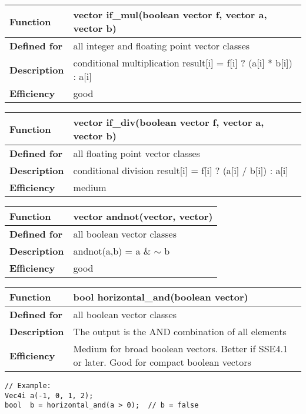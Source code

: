 \documentclass[vcl_manual.tex]{subfiles}
\begin{document}
\begin{tabular}{|p{30mm}|p{120mm}|}
\hline
\bfseries Function & vector if\_mul(boolean vector f, vector a, vector b) \\ \hline
\bfseries Defined for & all integer and floating point vector classes \\ \hline
\bfseries Description & conditional multiplication\newline
result[i] = f[i] ? (a[i] * b[i]) : a[i] \\ \hline
\bfseries Efficiency & good \\ \hline
\end{tabular}

\begin{tabular}{|p{30mm}|p{120mm}|}
\hline
\bfseries Function & vector if\_div(boolean vector f, vector a, vector b) \\ \hline
\bfseries Defined for & all floating point vector classes \\ \hline
\bfseries Description & conditional division\newline
result[i] = f[i] ? (a[i] / b[i]) : a[i] \\ \hline
\bfseries Efficiency & medium \\ \hline
\end{tabular}


\begin{tabular}{|p{30mm}|p{120mm}|}
\hline
\bfseries Function & vector andnot(vector, vector) \\ \hline
\bfseries Defined for & all boolean vector classes \\ \hline
\bfseries Description & andnot(a,b) = a \& $\sim$ b \\ \hline
\bfseries Efficiency & good \\ \hline
\end{tabular}

  
\begin{tabular}{|p{30mm}|p{120mm}|}
\hline
\bfseries Function & bool horizontal\_and(boolean vector) \\ \hline
\bfseries Defined for & all boolean vector classes \\ \hline
\bfseries Description & The output is the AND combination of all elements \\ \hline
\bfseries Efficiency & Medium for broad boolean vectors. Better if SSE4.1 or later. Good for compact boolean vectors \\ \hline
\end{tabular}
\begin{lstlisting}[frame=none]
// Example:
Vec4i a(-1, 0, 1, 2);
bool  b = horizontal_and(a > 0);  // b = false
\end{lstlisting}
\end{document}
